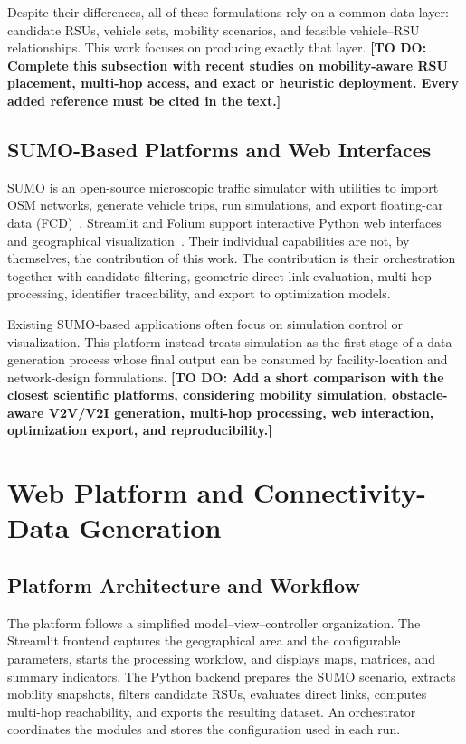 \documentclass[engproc,proceedingpaper,submit,oneauthor]{Definitions/mdpi}
\newcommand{\todo}[1]{{\color{todored}\textbf{[TO DO: #1]}}}
\begin{document}
	Despite their differences, all of these formulations rely on a common data layer:
	candidate RSUs, vehicle sets, mobility scenarios, and feasible vehicle--RSU
	relationships. This work focuses on producing exactly that layer. \todo{Complete
		this subsection with recent studies on mobility-aware RSU placement, multi-hop
		access, and exact or heuristic deployment. Every added reference must be cited in the
		text.}
	
	\subsection{SUMO-Based Platforms and Web Interfaces}
	SUMO is an open-source microscopic traffic simulator with utilities to import OSM
	networks, generate vehicle trips, run simulations, and export floating-car data
	(FCD)~\citep{ref-sumo,ref-osm}. Streamlit and Folium support interactive Python web
	interfaces and geographical visualization~\citep{ref-streamlit,ref-folium}. Their
	individual capabilities are not, by themselves, the contribution of this work. The
	contribution is their orchestration together with candidate filtering, geometric
	direct-link evaluation, multi-hop processing, identifier traceability, and export to
	optimization models.
	
	Existing SUMO-based applications often focus on simulation control or visualization.
	This platform instead treats simulation as the first stage of a data-generation
	process whose final output can be consumed by facility-location and network-design
	formulations. \todo{Add a short comparison with the closest scientific platforms,
		considering mobility simulation, obstacle-aware V2V/V2I generation, multi-hop
		processing, web interaction, optimization export, and reproducibility.}
	
	\section{Web Platform and Connectivity-Data Generation}\label{sec:method}
	
	\subsection{Platform Architecture and Workflow}
	The platform follows a simplified model--view--controller organization. The Streamlit
	frontend captures the geographical area and the configurable parameters, starts the
	processing workflow, and displays maps, matrices, and summary indicators. The Python
	backend prepares the SUMO scenario, extracts mobility snapshots, filters candidate
	RSUs, evaluates direct links, computes multi-hop reachability, and exports the
	resulting dataset. An orchestrator coordinates the modules and stores the
	configuration used in each run.
	
\end{document}

